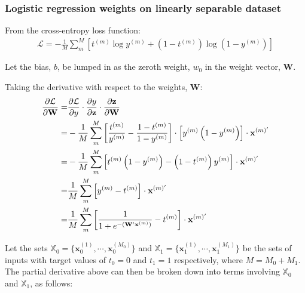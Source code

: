 \documentclass[a4paper,12pt]{article}
\begin{document}
\subsubsection{Logistic regression weights on linearly separable dataset}

From the cross-entropy loss function:
\begin{align}
\mathcal{L} = - \frac{1}{M} \sum_m^M \left[ t^{(m)} \log y^{(m)} +
	\left(1 - t^{(m)} \right) \log \left( 1 - y^{(m)} \right) \right]
\end{align}

Let the bias, $b$, be lumped in as the zeroth weight, $w_0$ in the weight vector, $\mathbf{W}$.

Taking the derivative with respect to the weights, $\mathbf{W}$:
\begin{align}
\begin{split}
\pdv{\mathcal{L}}{\mathbf{W}} =& \pdv{\mathcal{L}}{y} \cdot \pdv{y}{\mathbf{z}} \cdot 
	\pdv{\mathbf{z}}{\mathbf{W}} \\
=& - \frac{1}{M} \sum_m^M \left[ \frac{t^{(m)}}{y^{(m)}} -
	\frac{1 - t^{(m)}}{1 - y^{(m)}} \right] \cdot 
    \left[ y^{(m)} \left(1 - y^{(m)} \right) \right] \cdot
    \mathbf{x}^{(m)'} \\
=& - \frac{1}{M} \sum_m^M \left[ t^{(m)} \left( 1 - y^{(m)} \right) -
	\left( 1 - t^{(m)} \right) y^{(m)} \right] \cdot 
    \mathbf{x}^{(m)'} \\
=& \frac{1}{M} \sum_m^M \left[ y^{(m)} - t^{(m)} \right] \cdot 
    \mathbf{x}^{(m)'} \\
=& \frac{1}{M} \sum_m^M \left[ \frac{1}{1 + e^{- (\mathbf{W'x}^{(m)}) }} 
	- t^{(m)} \right] \cdot \mathbf{x}^{(m)'} \\
\end{split}
\end{align}

Let the sets $\mathbb{X}_0 = \{\mathbf{x}_0^{(1)}, \cdots, \mathbf{x}_0^{(M_0)} \}$ and $\mathbb{X}_1 = \{\mathbf{x}_1^{(1)}, \cdots, \mathbf{x}_1^{(M_1)} \}$ be the sets of inputs with target values of $t_0 = 0$ and $t_1 = 1$ respectively, where $M = M_0 + M_1$. The partial derivative above can  then be broken down into terms involving $\mathbb{X}_0$ and $\mathbb{X}_1$, as follows:
\end{document}
